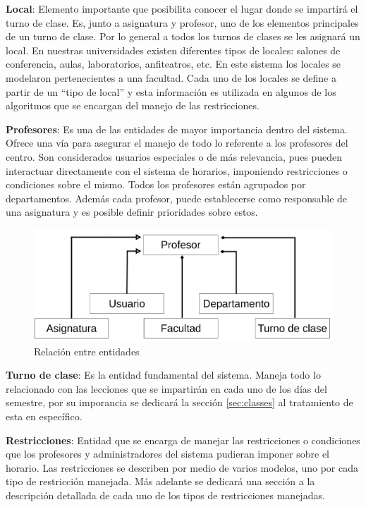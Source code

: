 \textbf{Local}: Elemento importante que posibilita conocer el lugar donde se impartirá el turno de clase. Es, junto a asignatura y profesor, uno de los elementos principales de un turno de clase. Por lo general a todos los turnos de clases se les asignará un local. En nuestras universidades existen diferentes tipos de locales: salones de conferencia, aulas, laboratorios, anfiteatros, etc. En este sistema los locales se modelaron pertenecientes a una facultad. Cada uno de los locales se define a partir de un “tipo de local” y esta información es utilizada en algunos de los algoritmos que se encargan del manejo de las restricciones.

\textbf{Profesores}: Es una de las entidades de mayor importancia dentro del sistema. Ofrece una vía para asegurar el manejo de todo lo referente a los profesores del centro. Son considerados usuarios especiales o de más relevancia, pues pueden interactuar directamente con el sistema de horarios, imponiendo restricciones o condiciones sobre el mismo. Todos los profesores están agrupados por departamentos. Además cada profesor, puede establecerse como responsable de una asignatura y es posible definir prioridades sobre estos.

\begin{figure}[h!]
	\centering
	\includegraphics[width=0.75\linewidth]{images/Chapter 2/teacher_relation}
	\caption{Relación entre entidades}
	\label{fig:teacher_relation}
\end{figure}

\textbf{Turno de clase}: Es la entidad fundamental del sistema. Maneja todo lo relacionado con las lecciones que se impartirán en cada uno de los días del semestre, por su imporancia se dedicará la sección \ref{sec:classes} al tratamiento de esta en específico.

\textbf{Restricciones}: Entidad que se encarga de manejar las restricciones o condiciones que los profesores y administradores del sistema pudieran imponer sobre el horario. Las restricciones se describen por medio de varios modelos, uno por cada tipo de restricción manejada. Más adelante se dedicará una sección a la descripción detallada de cada uno de los tipos de restricciones manejadas.

